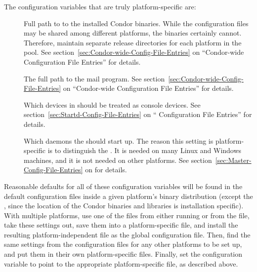 The configuration variables that are truly platform-specific are:

\begin{description}

\item[] Full path to to the installed
  Condor binaries.  While the configuration files may be shared among
  different platforms, the binaries certainly cannot.  Therefore,
  maintain separate release directories for each platform
  in the pool.  See section~\ref{sec:Condor-wide-Config-File-Entries}
  on ``Condor-wide Configuration File Entries'' for details.

\item[] The full path to the mail program.  See
  section~\ref{sec:Condor-wide-Config-File-Entries} on ``Condor-wide
  Configuration File Entries'' for details.

\item[] Which devices in  should be
  treated as console devices.  See
  section~\ref{sec:Startd-Config-File-Entries} on ``
  Configuration File Entries'' for details.

\item[] Which daemons the  should
  start up.  The reason this setting is platform-specific is
  to distinguish the .
  It is needed on many Linux and Windows machines,
  and it is not needed on other platforms.
  See section~\ref{sec:Master-Config-File-Entries} on
  for details.

\end{description}

Reasonable defaults for all of these configuration variables
will be found in the
default configuration files inside a given platform's binary distribution
(except the , since 
the location of the Condor binaries and libraries is installation specific).
With multiple platforms,
use one of the  files from
either running  or from the
 file,
take these settings out,
save them into a platform-specific file,
and install the resulting platform-independent file as the global
configuration file.
Then,
find the same settings from the configuration files for any other platforms
to be set up, and put them in their own platform-specific files.
Finally, set the  configuration variable
to point to
the appropriate platform-specific file, as described above.


